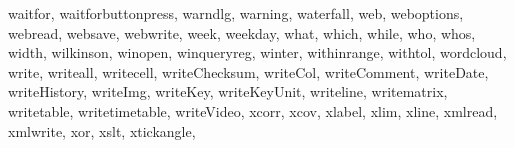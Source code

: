 {{        waitfor,%
        waitforbuttonpress,%
        warndlg,%
        warning,%
        waterfall,%
        web,%
        weboptions,%
        webread,%
        websave,%
        webwrite,%
        week,%
        weekday,%
        what,%
        which,%
        while,%
        who,%
        whos,%
        width,%
        wilkinson,%
        winopen,%
        winqueryreg,%
        winter,%
        withinrange,%
        withtol,%
        wordcloud,%
        write,%
        writeall,%
        writecell,%
        writeChecksum,%
        writeCol,%
        writeComment,%
        writeDate,%
        writeHistory,%
        writeImg,%
        writeKey,%
        writeKeyUnit,%
        writeline,%
        writematrix,%
        writetable,%
        writetimetable,%
        writeVideo,%
        xcorr,%
        xcov,%
        xlabel,%
        xlim,%
        xline,%
        xmlread,%
        xmlwrite,%
        xor,%
        xslt,%
        xtickangle,%
}}
